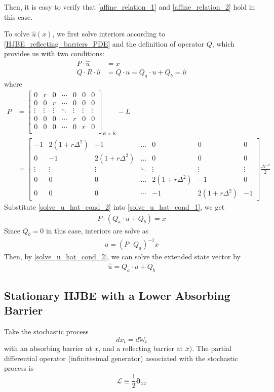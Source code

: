 \documentclass[11pt]{article}
\newcommand{\D}[1][]{\ensuremath{\boldsymbol{\partial}_{#1}}}
\newcommand{\W}{\ensuremath{\mathbb{W}}}
\begin{document}
Then, it is easy to verify that \eqref{affine_relation_1} and \eqref{affine_relation_2} hold in this case.

To solve $\hat{u}(x)$, we first solve interiors according to \eqref{HJBE_reflecting_barriers_PDE} and the definition of operator $Q$, which provides us with two conditions:
\begin{align}
P\cdot\hat{u} &= x\label{solve_u_hat_cond_1}\\
Q\cdot R\cdot\hat{u} &= Q\cdot u = Q_a\cdot u+Q_b = \hat{u}\label{solve_u_hat_cond_2}
\end{align}
where 
\begin{align}
P &= \begin{bmatrix}
0&r&0&\cdots&0&0&0\\
0&0&r&\cdots&0&0&0\\
\vdots&\vdots&\vdots&\ddots&\vdots&\vdots&\vdots\\
0&0&0&\cdots&r&0&0\\
0&0&0&\cdots&0&r&0\\
\end{bmatrix}_{K\times\hat{K}}-L \nonumber \\
&= \begin{bmatrix}
-1&2(1+r\Delta^2)&-1&\dots&0&0&0\\
0&-1&2(1+r\Delta^2)&\dots&0&0&0\\
\vdots&\vdots&\vdots&\ddots&\vdots&\vdots&\vdots\\
0&0&0&\dots&2(1+r\Delta^2)&-1&0\\
0&0&0&\cdots&-1&2(1+r\Delta^2)&-1
\end{bmatrix}\frac{\Delta^{-2}}{2}
\end{align}
Substitute \eqref{solve_u_hat_cond_2} into \eqref{solve_u_hat_cond_1}, we get
\begin{align}
P\cdot(Q_a\cdot u+Q_b) = x
\end{align}
Since $Q_b = 0$ in this case, interiors are solve as
\begin{align}
u = (P\cdot Q_a)^{-1}x
\end{align}
Then, by \eqref{solve_u_hat_cond_2}, we can solve the extended state vector by
\begin{align}
\hat{u} = Q_a\cdot u+Q_b\label{solve_u_hat_in_terms_of_interiors}
\end{align}

\subsection{Stationary HJBE with a Lower Absorbing Barrier}
Take the stochastic process
$$
d x_t = d \W_t
$$
with an absorbing barrier at $\underline{x}$, and a reflecting barrier at $\bar{x})$.  The partial differential operator (infinitesimal generator) associated with the stochastic process is
$$
\mathcal{L} \equiv \frac{1}{2}\D[xx]
$$
\end{document}
